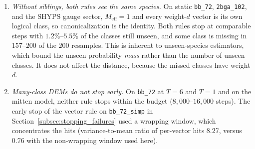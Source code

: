 \documentclass[12pt]{article}
\theoremstyle{definition}
\newcommand{\ttt}[1]{\texttt{#1}}
\begin{document}
\begin{enumerate}[label=(\arabic*)]
    misses $1.3\%$--$2.0\%$ of the clusters but no logical class.
  \item \emph{Without siblings, both rules see the same species.} On static \ttt{bb\_72}, \ttt{2bga\_102}, and the
    SHYPS gauge sector, $M_{\mathrm{eff}} = 1$ and every weight-$d$ vector is its own logical class, so
    canonicalization is the identity. Both rules stop at comparable steps with $1.2\%$--$5.5\%$ of the classes still
    unseen, and some class is missing in $157$--$200$ of the $200$ resamples. This is inherent to unseen-species
    estimators, which bound the unseen probability \emph{mass} rather than the number of unseen classes. It does not
    affect the distance, because the missed classes have weight $d$.
  \item \emph{Many-class DEMs do not stop early.} On \ttt{bb\_72} at $T = 6$ and $T = 1$ and on the mitten model,
    neither rule stops within the budget ($8{,}000$--$16{,}000$ steps). The early stop of the vector rule on
    \ttt{bb\_72\_simp} in Section~\ref{subsec:stopping_failures} used a wrapping window, which concentrates the hits
    (variance-to-mean ratio of per-vector hits $8.27$, versus $0.76$ with the non-wrapping window used here).
\end{enumerate}
\end{document}
